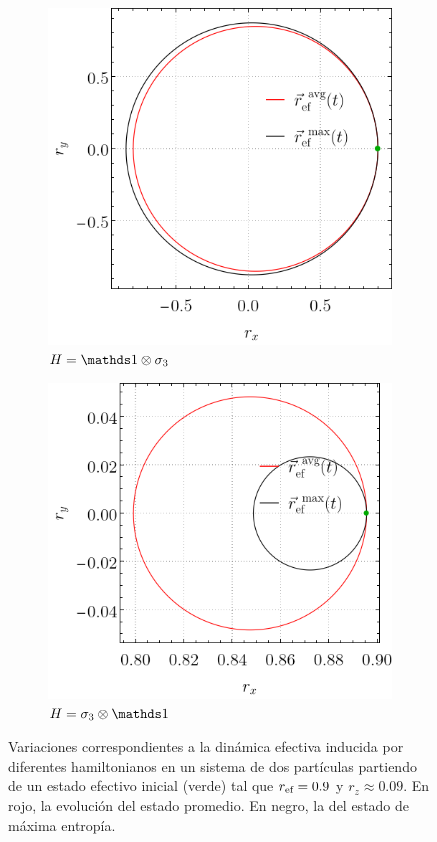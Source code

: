 \begin{figure}[ht!]
    \centering
    \begin{subfigure}{0.5\textwidth}
      \centering
      \includegraphics[width=0.8\linewidth]{appendices/figures/local_AvgVSMax_p2=0.1_r=0.9_w1=0_w2=1.png}
      \caption{$H=\Id\otimes\pauli{3}$}
    \end{subfigure}%
    \begin{subfigure}{0.5\textwidth}
      \centering
      \includegraphics[width=0.8\linewidth]{appendices/figures/local_AvgVSMax_p2=0.1_r=0.9_w1=1_w2=0.png}
      \caption{$H=\pauli{3}\otimes\Id$}
    \end{subfigure}
    \caption{Variaciones correspondientes a la dinámica efectiva inducida por diferentes hamiltonianos en un sistema de dos partículas partiendo de un estado efectivo inicial (verde) tal que $r_{\text{ef}}=0.9$ y $r_{z}\approx0.09$. En rojo, la evolución del estado promedio. En negro, la del estado de máxima entropía. \label{ap:EffDunAVGvsMaxEnt1}}
\end{figure}

